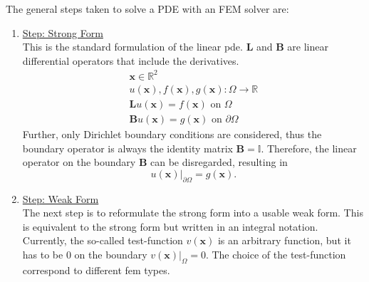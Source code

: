 \documentclass[./\jobname.tex]{subfiles}
\begin{document}
The general steps taken to solve a PDE with an FEM solver are: 
\begin{enumerate}
	\item \underline{Step: Strong Form} \\
		  This is the standard formulation of the linear \gls{pde}. $\mathbf{L}$ and $\mathbf{B}$ are linear differential operators that include the derivatives. \\
		  \begin{equation}
		  \label{eq: strong form}
			  \begin{split}
			  	\mathbf{x} \in \mathbb{R}^2 \\
			  	u(\mathbf{x}), f(\mathbf{x}), g(\mathbf{x}): \Omega \rightarrow \mathbb{R} \\
				\mathbf{L} u(\mathbf{x}) = f(\mathbf{x}) \text{ on $\Omega$} \\
				\mathbf{B} u(\mathbf{x}) = g(\mathbf{x}) \text{ on $\partial \Omega$}
			  \end{split}
		  \end{equation}
		  Further, only Dirichlet boundary conditions are considered, thus the boundary operator is always the identity matrix $\mathbf{B} = \mathbb{I}$. Therefore, the linear operator on the boundary $\mathbf{B}$ can be disregarded, resulting in  \\
		  \begin{equation}
		  	u(\mathbf{x})|_{\partial \Omega} = g(\mathbf{x}) .
		  \end{equation}
		  
	\item \underline{Step: Weak Form} \\
		  The next step is to reformulate the strong form into a usable weak form. This is equivalent to the strong form but written in an integral notation. Currently, the so-called test-function $v(\mathbf{x})$ is an arbitrary function, but it has to be 0 on the boundary $v(\mathbf{x})|_{\Omega} = 0$. The choice of the test-function correspond to different \gls{fem} types. \cite[p. 6f]{shen_spectral_2011}\\
		  

\end{enumerate}
\end{document}
